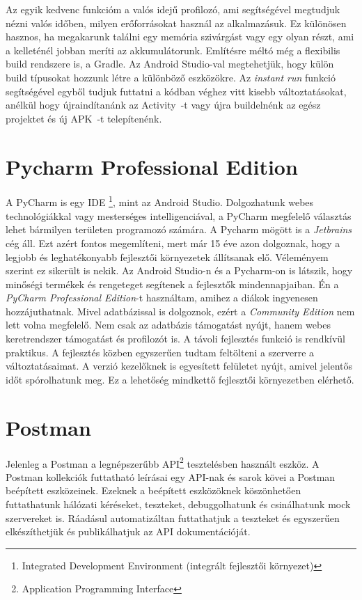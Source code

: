 \documentclass{thesis-ekf}
\theoremstyle{definition}
\theoremstyle{remark}
\begin{document}
Az egyik kedvenc funkcióm a valós idejű profilozó, ami segítségével megtudjuk nézni valós időben, milyen erőforrásokat használ az alkalmazásuk.
Ez különösen hasznos, ha megakarunk találni egy memória szivárgást vagy egy olyan részt, ami a kelleténél jobban meríti az akkumulátorunk.
Említésre méltó még a flexibilis build rendszere is, a Gradle. 
Az Android Studio-val megtehetjük, hogy külön build típusokat hozzunk létre a különböző eszközökre.
Az \emph{instant run} funkció segítségével egyből tudjuk futtatni a kódban véghez vitt kisebb változtatásokat, anélkül hogy újraindítanánk az Activity~-t vagy újra buildelnénk az egész projektet és új APK~-t telepítenénk.
\cite{androidstudio}

\section{Pycharm Professional Edition}

A PyCharm is egy IDE \footnote{Integrated Development Environment (integrált fejlesztői környezet)}, mint az Android Studio.
Dolgozhatunk webes technológiákkal vagy mesterséges intelligenciával, a PyCharm megfelelő választás lehet bármilyen területen programozó számára.
A Pycharm mögött is a \emph{Jetbrains} cég áll. Ezt azért fontos megemlíteni, mert már 15 éve azon dolgoznak, hogy a legjobb és leghatékonyabb fejlesztői környezetek állítsanak elő.
Véleményem szerint ez sikerült is nekik. Az Android Studio-n és a Pycharm-on  is látszik, hogy minőségi termékek és rengeteget segítenek a fejlesztők mindennapjaiban.
Én a \emph{PyCharm Professional Edition}-t használtam, amihez a diákok ingyenesen hozzájuthatnak.
Mivel adatbázissal is dolgoznok, ezért a \emph{Community Edition} nem lett volna megfelelő.
Nem csak az adatbázis támogatást nyújt, hanem webes keretrendszer támogatást és profilozót is.
A távoli fejlesztés funkció is rendkívül praktikus. A fejlesztés közben egyszerűen tudtam feltölteni a szerverre a változtatásaimat.
A verzió kezelőknek is egyesített felületet nyújt, amivel jelentős időt spórolhatunk meg.\cite{pycharm}
Ez a lehetőség mindkettő fejlesztői környezetben elérhető.

\section{Postman}

Jelenleg a Postman a legnépszerűbb API\footnote{Application Programming Interface} tesztelésben használt eszköz.
A Postman kollekciók futtatható leírásai egy API-nak és sarok kövei a Postman beépített eszközeinek.
Ezeknek a beépített eszközöknek köszönhetően futtathatunk hálózati kéréseket, teszteket, debuggolhatunk és csinálhatunk mock szervereket is.
Ráadásul automatizáltan futtathatjuk a teszteket és egyszerűen elkészíthetjük és publikálhatjuk az API dokumentációját.
\end{document}
